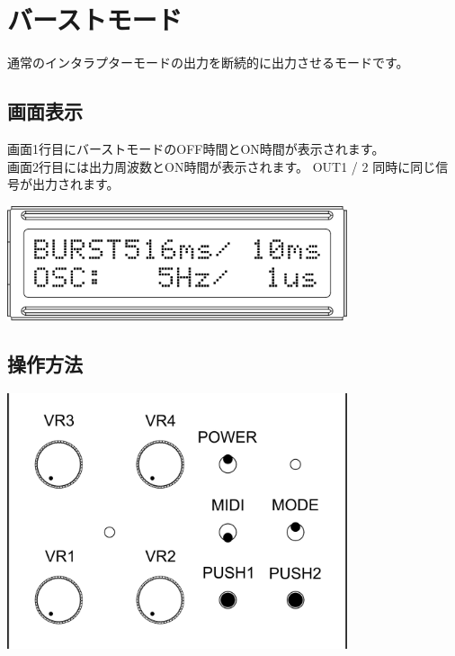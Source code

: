 \documentclass[a4paper,11pt]{jsarticle}
\begin{document}
\clearpage

\section{バーストモード}

通常のインタラプターモードの出力を断続的に出力させるモードです。

\subsection{画面表示}

画面1行目にバーストモードのOFF時間とON時間が表示されます。 \\
画面2行目には出力周波数とON時間が表示されます。 OUT1 / 2 同時に同じ信号が出力されます。

\vspace*{5mm}
\begin{center}
\includegraphics[width=100mm]{image/Arduino_Interrupter_v1_LCD_BURST.png}
\end{center}
\vspace*{5mm}

\subsection{操作方法}

\vspace*{5mm}
\begin{center}
\includegraphics[width=100mm]{image/Arduino_Interrupter_v1_Design_Burst.png}
\end{center}
\vspace*{5mm}
\end{document}
